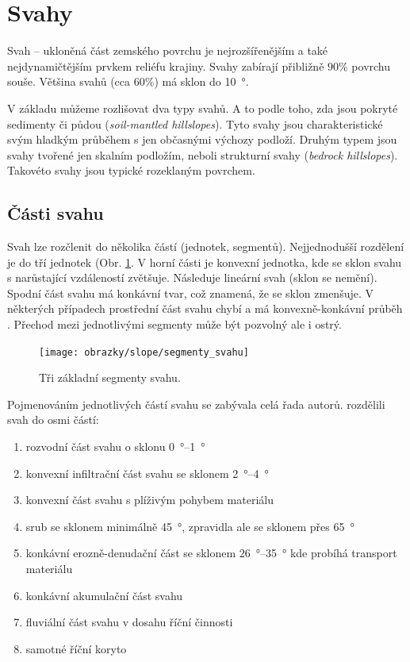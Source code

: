 \section{Svahy}
Svah -- ukloněná část zemského povrchu je nejrozšířenějším a také nejdynamičtějším prvkem reliéfu krajiny. Svahy zabírají přibližně $90 \%$ povrchu souše. Většina svahů (cca $60 \%$) má sklon do \SI{10}{\degree}. 

V základu můžeme rozlišovat dva typy svahů.  A to podle toho, zda jsou pokryté sedimenty či půdou (\textit{soil-mantled hillslopes}). Tyto svahy jsou charakteristické svým hladkým průběhem s jen občasnými výchozy podloží. Druhým typem jsou svahy tvořené jen skalním podložím, neboli strukturní svahy (\textit{bedrock hillslopes}). Takovéto svahy jsou typické rozeklaným povrchem.


\subsection{Části svahu}
Svah lze rozčlenit do několika částí (jednotek, segmentů). Nejjednodušší rozdělení je do tří jednotek (Obr. \ref{fig:segmenty_svahu}. V horní části je konvexní jednotka, kde se sklon svahu s narůstající vzdáleností zvětšuje. Následuje lineární svah (sklon se nemění). Spodní část svahu má konkávní tvar, což znamená, že se sklon zmenšuje. V některých případech prostřední část svahu chybí a má konvexně-konkávní průběh \parencite{whiteConvexConcaveLandslopesGeometrical1966}. Přechod mezi jednotlivými segmenty může být pozvolný ale i ostrý.

\begin{figure}[h]
	\centering
	\texttt{[image: obrazky/slope/segmenty\_svahu]}
	\caption{Tři základní segmenty svahu.}
	\label{fig:segmenty_svahu}
\end{figure}


Pojmenováním jednotlivých částí svahu se zabývala celá řada autorů. \textcite{dalrympleHypotheticalNineUnit1968} rozdělili svah do osmi částí:
\begin{enumerate}
	\item rozvodní část svahu o sklonu \SIrange{0}{1}{\degree}
	\item konvexní infiltrační část svahu se sklonem \SIrange{2}{4}{\degree}
	\item konvexní část svahu s plíživým pohybem materiálu 
	\item srub se sklonem minimálně \SI{45}{\degree}, zpravidla ale se sklonem přes \SI{65}{\degree}
	\item konkávní erozně-denudační část se sklonem \SIrange{26}{35}{\degree} kde probíhá transport materiálu
	\item konkávní akumulační část svahu
	\item fluviální část svahu v dosahu říční činnosti
	\item samotné říční koryto
\end{enumerate}

